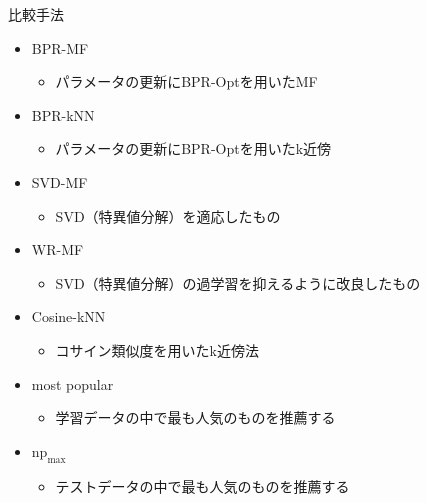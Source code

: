 \documentclass[aspectratio=43, dvipdfmx, 11pt]{beamer} %
\begin{document}
\begin{frame}{比較手法}
    \begin{itemize}
        \item \alert{BPR-MF}
        \begin{itemize}
            \item パラメータの更新にBPR-Optを用いたMF
        \end{itemize}
        \item \alert{BPR-kNN}
        \begin{itemize}
            \item パラメータの更新にBPR-Optを用いたk近傍
        \end{itemize}
        \item SVD-MF 
        \begin{itemize}
            \item SVD（特異値分解）を適応したもの
        \end{itemize}
        \item WR-MF
        \begin{itemize}
            \item SVD（特異値分解）の過学習を抑えるように改良したもの
        \end{itemize}
        \item Cosine-kNN
        \begin{itemize}
            \item コサイン類似度を用いたk近傍法
        \end{itemize}
        \item most popular
        \begin{itemize}
            \item 学習データの中で最も人気のものを推薦する
        \end{itemize}
        \item $\text{np}_{\text{max}}$
        \begin{itemize}
            \item テストデータの中で最も人気のものを推薦する
        \end{itemize}
    \end{itemize}
\end{frame}
\end{document}
